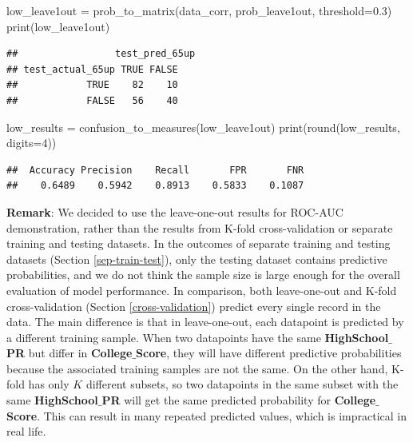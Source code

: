 \documentclass[
]{article}
\newenvironment{Shaded}{\begin{snugshade}}{\end{snugshade}}
\newcommand{\AttributeTok}[1]{\textcolor[rgb]{0.77,0.63,0.00}{#1}}
\newcommand{\DecValTok}[1]{\textcolor[rgb]{0.00,0.00,0.81}{#1}}
\newcommand{\FloatTok}[1]{\textcolor[rgb]{0.00,0.00,0.81}{#1}}
\newcommand{\FunctionTok}[1]{\textcolor[rgb]{0.00,0.00,0.00}{#1}}
\newcommand{\NormalTok}[1]{#1}
\newcommand{\OtherTok}[1]{\textcolor[rgb]{0.56,0.35,0.01}{#1}}
\begin{document}
\begin{Shaded}
\begin{Highlighting}[]
\NormalTok{low\_leave1out }\OtherTok{=} \FunctionTok{prob\_to\_matrix}\NormalTok{(data\_corr, prob\_leave1out, }\AttributeTok{threshold=}\FloatTok{0.3}\NormalTok{)}
\FunctionTok{print}\NormalTok{(low\_leave1out)}
\end{Highlighting}
\end{Shaded}

\begin{verbatim}
##                 test_pred_65up
## test_actual_65up TRUE FALSE
##            TRUE    82    10
##            FALSE   56    40
\end{verbatim}

\begin{Shaded}
\begin{Highlighting}[]
\NormalTok{low\_results }\OtherTok{=} \FunctionTok{confusion\_to\_measures}\NormalTok{(low\_leave1out)}
\FunctionTok{print}\NormalTok{(}\FunctionTok{round}\NormalTok{(low\_results, }\AttributeTok{digits=}\DecValTok{4}\NormalTok{))}
\end{Highlighting}
\end{Shaded}

\begin{verbatim}
##  Accuracy Precision    Recall       FPR       FNR 
##    0.6489    0.5942    0.8913    0.5833    0.1087
\end{verbatim}

\textbf{Remark}: We decided to use the leave-one-out results for ROC-AUC
demonstration, rather than the results from K-fold cross-validation or
separate training and testing datasets. In the outcomes of separate
training and testing datasets (Section \ref{sep-train-test}), only the
testing dataset contains predictive probabilities, and we do not think
the sample size is large enough for the overall evaluation of model
performance. In comparison, both leave-one-out and K-fold
cross-validation (Section \ref{cross-validation}) predict every single
record in the data. The main difference is that in leave-one-out, each
datapoint is predicted by a different training sample. When two
datapoints have the same \textbf{HighSchool$\_$PR} but differ in
\textbf{College$\_$Score}, they will have different predictive
probabilities because the associated training samples are not the same.
On the other hand, K-fold has only \(K\) different subsets, so two
datapoints in the same subset with the same \textbf{HighSchool$\_$PR}
will get the same predicted probability for \textbf{College$\_$Score}.
This can result in many repeated predicted values, which is impractical
in real life.
\end{document}
